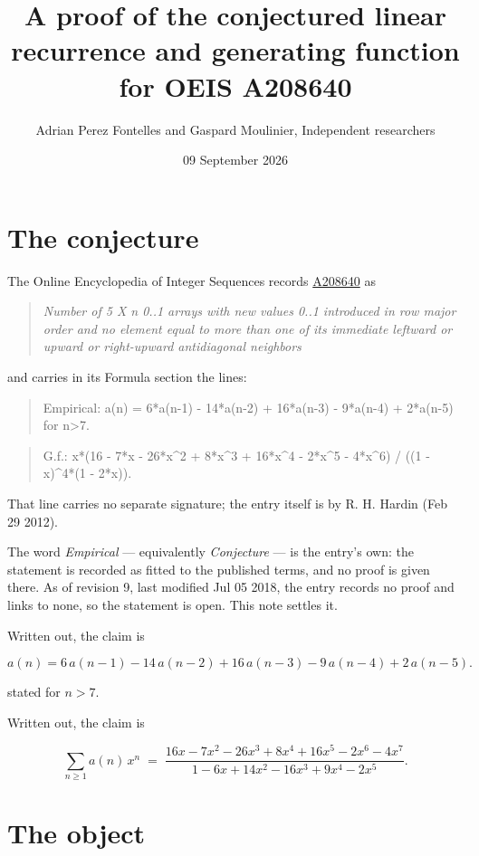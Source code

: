 \documentclass[11pt]{article}
\title{A proof of the conjectured linear recurrence and generating function for OEIS A208640}
\author{Adrian Perez Fontelles and Gaspard Moulinier, Independent researchers}
\date{09 September 2026}
\theoremstyle{definition}
\begin{document}
\maketitle
\section{The conjecture}

The Online Encyclopedia of Integer Sequences records \href{https://oeis.org/A208640}{A208640} as

\begin{quote}\itshape Number of 5 X n 0..1 arrays with new values 0..1 introduced in row major order and no element equal to more than one of its immediate leftward or upward or right-upward antidiagonal neighbors\end{quote}

and carries in its Formula section the lines:

\begin{quote}\ttfamily Empirical: a(n) = 6*a(n-1) - 14*a(n-2) + 16*a(n-3) - 9*a(n-4) + 2*a(n-5) for n>7.\end{quote}

\begin{quote}\ttfamily G.f.: x*(16 - 7*x - 26*x\textasciicircum{}2 + 8*x\textasciicircum{}3 + 16*x\textasciicircum{}4 - 2*x\textasciicircum{}5 - 4*x\textasciicircum{}6) / ((1 - x)\textasciicircum{}4*(1 - 2*x)).\end{quote}

That line carries no separate signature; the entry itself is by R. H. Hardin (Feb 29 2012).

The word {\itshape Empirical} --- equivalently {\itshape Conjecture} --- is the entry's own: the statement is recorded as fitted to the published terms, and no proof is given there. As of revision 9, last modified Jul 05 2018, the entry records no proof and links to none, so the statement is open. This note settles it.

Written out, the claim is

\[a(n) = 6\,a(n-1) - 14\,a(n-2) + 16\,a(n-3) - 9\,a(n-4) + 2\,a(n-5).\]

stated for $n > 7$.

Written out, the claim is

\[\sum_{n \ge 1} a(n)\,x^n \;=\; \frac{16x - 7x^{2} - 26x^{3} + 8x^{4} + 16x^{5} - 2x^{6} - 4x^{7}}{1 - 6x + 14x^{2} - 16x^{3} + 9x^{4} - 2x^{5}}.\]

\section{The object}
\end{document}
